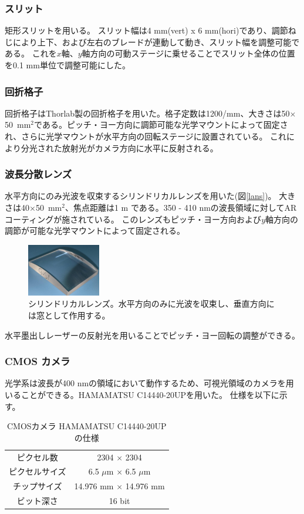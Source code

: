\documentclass[a4paper,11pt,uplatex]{jsbook}
\begin{document}
\subsubsection{スリット}
矩形スリットを用いる。
スリット幅は4 mm(vert) x 6 mm(hori)であり、調節ねじにより上下、および左右のブレードが連動して動き、スリット幅を調整可能である。
これを$x$軸、$y$軸方向の可動ステージに乗せることでスリット全体の位置を0.1 mm単位で調整可能にした。

\subsubsection{回折格子}
回折格子はThorlab製の回折格子\cite{grating}を用いた。格子定数は1200/mm、大きさは50$\times$50~mm$^2$である。ピッチ・ヨー方向に調節可能な光学マウントによって固定され、さらに光学マウントが水平方向の回転ステージに設置されている。
これにより分光された放射光がカメラ方向に水平に反射される。

\subsubsection{波長分散レンズ}
水平方向にのみ光波を収束するシリンドリカルレンズを用いた(図\ref{lans})。
大きさは40$\times$50~mm$^2$、焦点距離は1 m である。350 - 410 nmの波長領域に対してARコーティングが施されている。
このレンズもピッチ・ヨー方向および$y$軸方向の調節が可能な光学マウントによって固定される。
\begin{figure}[h]
  \centering
  \includegraphics[width=0.4\linewidth]{image/3-lens.png}
  \caption[シリンドリカルレンズ]{シリンドリカルレンズ。水平方向のみに光波を収束し、垂直方向には窓として作用する。}
  \label{lens}
\end{figure}
水平墨出しレーザーの反射光を用いることでピッチ・ヨー回転の調整ができる。

\subsubsection{CMOS カメラ}
光学系は波長が400 nmの領域において動作するため、可視光領域のカメラを用いることができる。HAMAMATSU C14440-20UPを用いた。
仕様を以下に示す。
\begin{table}[h]
\centering
\begin{tabular}{c|c}
  ピクセル数 & 2304 $\times$ 2304\\
  ピクセルサイズ & 6.5 $\mu$m $\times$ 6.5 $\mu$m\\
  チップサイズ & 14.976 mm $\times$ 14.976 mm\\
  ビット深さ & 16 bit\\ 
\end{tabular}
\caption[CMOSカメラの仕様]{CMOSカメラ HAMAMATSU C14440-20UP の仕様}
\end{table}
\end{document}
